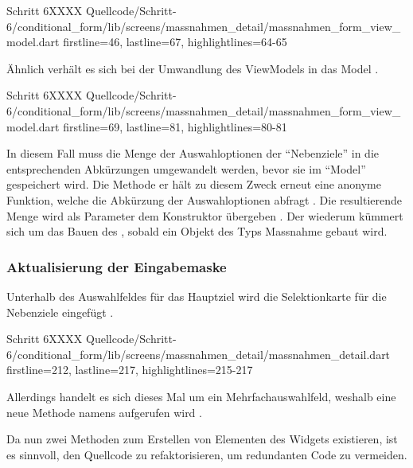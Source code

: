 \begin{alexlisting}{Schritt 6}{XXXX}
  {Quellcode/Schritt-6/conditional_form/lib/screens/massnahmen_detail/massnahmen_form_view_model.dart}
  {firstline=46, lastline=67, highlightlines={64-65}}
  \label{lst:Schritt6setModel}
\end{alexlisting}


Ähnlich verhält es sich bei der Umwandlung des ViewModels in das Model \Lst{\ref{lst:Schritt6nebenzieleSetBuilder}}.

\begin{alexlisting}{Schritt 6}{XXXX}
  {Quellcode/Schritt-6/conditional_form/lib/screens/massnahmen_detail/massnahmen_form_view_model.dart}
  {firstline=69, lastline=81, highlightlines={80-81}}
  \label{lst:Schritt6nebenzieleSetBuilder}
\end{alexlisting}

In diesem Fall muss die Menge der Auswahloptionen der \enquote{Nebenziele} in die entsprechenden Abkürzungen umgewandelt werden,
bevor sie im \enquote{Model} gespeichert wird.
Die Methode  er hält zu diesem Zweck erneut eine anonyme Funktion,
welche die Abkürzung der Auswahloptionen abfragt .
Die resultierende Menge wird als Parameter dem Konstruktor  übergeben .
Der  wiederum kümmert sich um das Bauen des , sobald ein Objekt des Typs Massnahme gebaut wird.



\subsubsection{Aktualisierung der Eingabemaske}

Unterhalb des Auswahlfeldes für das Hauptziel wird die Selektionkarte für die Nebenziele eingefügt \Lst{\ref{lst:Schritt6buildMultiSelectionCardnebenzielsetzungLandChoices}}.
\begin{alexlisting}{Schritt 6}{XXXX}
  {Quellcode/Schritt-6/conditional_form/lib/screens/massnahmen_detail/massnahmen_detail.dart}
  {firstline=212, lastline=217, highlightlines={215-217}}
  \label{lst:Schritt6buildMultiSelectionCardnebenzielsetzungLandChoices}
\end{alexlisting}

Allerdings handelt es sich dieses Mal um ein Mehrfachauswahlfeld,
weshalb eine neue Methode namens  aufgerufen wird .

Da nun zwei Methoden zum Erstellen von Elementen des Widgets  existieren,
ist es sinnvoll,
den Quellcode zu refaktorisieren,
um redundanten Code zu vermeiden.



